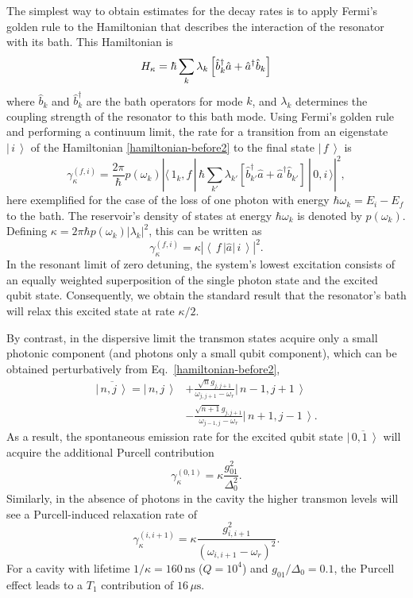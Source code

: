 \documentclass[twocolumn,amsmath,amssymb,floatfix,pra,showpacs,eqsecnum,footinbib,superscriptaddress]{revtex4}
\newcommand{\abs}[1]{\left|#1\right|}
\newcommand{\bra}[1]{\left\langle \, #1 \,\right|}
\newcommand{\ket}[1]{\left|\, #1 \, \right\rangle}
\newcommand{\boket}[3]{\langle\, #1 \,|\, #2 \,|\, #3 \,\rangle}
\newcommand{\dg}{\dag}
\newcommand{\be}{\begin{equation}}
\newcommand{\ee}{\end{equation}}
\begin{document}
The simplest way to obtain estimates for the decay rates is to apply Fermi's golden rule to the Hamiltonian that describes the interaction of the resonator with its bath. This Hamiltonian is  
\be
H_{\rm \kappa}= \hbar\sum_k \lambda_k \left[\hat{b}^{\dg}_k \hat{a}  + \hat{a}^{\dg} \hat{b}_k\right] \ee
 where $\hat{b}_k$ and $\hat{b}_k^\dg$ are the bath operators for mode $k$, and $ \lambda_k$ determines the coupling strength of the resonator to this bath mode. 
 Using Fermi's golden rule and performing a continuum limit, the rate for a transition from an eigenstate $\ket{i}$  of the Hamiltonian \eqref{hamiltonian-before2} to the final state $\ket{f}$ is  
\be
\gamma_\kappa^{(f,i)} = \frac{2\pi}{\hbar} p(\omega_k) \abs{\boket{1_{k},f}{ \hbar\sum_{k'}\lambda_{k'}\left[\hat{b}^{\dag}_{k'} \hat{a} +
\hat{a}^\dg \hat{b}_{k'}\right]}{0,i}}^2,
\ee
here exemplified for the case of the loss of one photon with energy $\hbar\omega_k=E_i-E_f$ to the bath. The reservoir's density of states at energy $\hbar\omega_k$ is denoted by $p(\omega_k)$.  Defining $\kappa = 2\pi\hbar p(\omega_k) |\lambda_k|^2$, this can be written as  
\be
\gamma_\kappa^{(f,i)} =  \kappa \left| \bra{f} \hat{a} \ket{i} \right|^2.
\ee
In the resonant limit of zero detuning, the system's lowest excitation consists of an equally weighted superposition of the single photon state and the excited qubit state.  Consequently, we obtain the standard result that  the resonator's bath will relax this excited state at rate $\kappa/2$.

By contrast, in the dispersive limit the transmon states acquire only a small photonic component (and photons only a small qubit component), which can be obtained perturbatively from Eq.~\eqref{hamiltonian-before2},
\begin{align}
\overline{\ket{n,j}}=\ket{n,j} &+ \frac{\sqrt{n}g_{j,j+1}}{\omega_{j,j+1}-\omega_r}\ket{n-1,j+1}\\\nonumber &-\frac{\sqrt{n+1}g_{j,j+1}}{\omega_{j-1,j}-\omega_r}\ket{n+1,j-1}.
\end{align}
As a result, the spontaneous emission rate for the excited qubit state $\overline{\ket{0,1}}$ will acquire the additional Purcell contribution
\be
\gamma_\kappa^{(0,1)}= \kappa\frac{g^2_{01}}{\Delta_0^2}. 
\ee
Similarly, in the absence of photons in the cavity the higher transmon levels will see a Purcell-induced relaxation rate of 
\be
\gamma_\kappa^{(i,i+1)} =  \kappa \frac{g^2_{i,i+1}}{(\omega_{i,i+1}-\omega_r)^2}.
\ee
For a cavity with lifetime $1/\kappa=160\,\text{ns}$ ($Q=10^4$) and $g_{01}/\Delta_0=0.1$,  the Purcell effect leads to a $T_1$ contribution of $16\,\mu\text{s}$.
\end{document}
